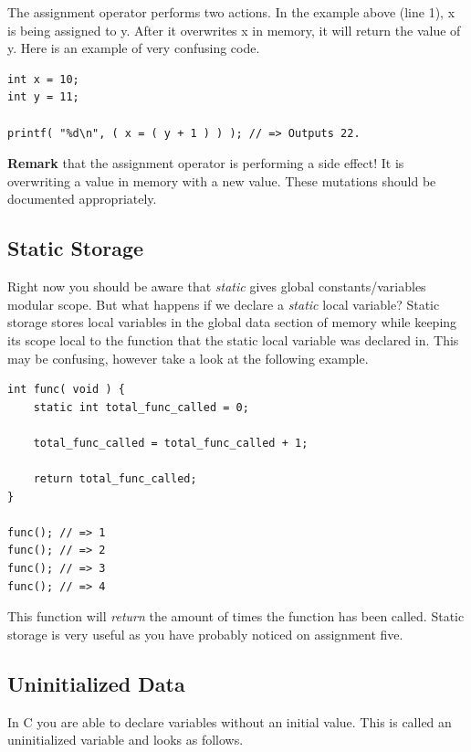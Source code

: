 \documentclass[12pt,extarticle]{article}
\begin{document}
The assignment operator performs two actions. In the example above (line 1), x is being assigned to y. After it overwrites x in memory, it will return the value of y. Here is an example of very confusing code.\\

\lstset {
	language=c
}
\begin{lstlisting}
int x = 10;
int y = 11;

printf( "%d\n", ( x = ( y + 1 ) ) ); // => Outputs 22.
\end{lstlisting}

\textbf{Remark} that the assignment operator is performing a side effect! It is overwriting a value in memory with a new value. These mutations should be documented appropriately.

\subsection{Static Storage}

Right now you should be aware that \emph{static} gives global constants/variables modular scope. But what happens if we declare a \emph{static} local variable? Static storage stores local variables in the global data section of memory while keeping its scope local to the function that the static local variable was declared in. This may be confusing, however take a look at the following example.\\

\lstset {
	language=c
}
\begin{lstlisting}
int func( void ) {
	static int total_func_called = 0;
	
	total_func_called = total_func_called + 1;
	
	return total_func_called;
}

func(); // => 1
func(); // => 2
func(); // => 3
func(); // => 4
\end{lstlisting}

This function will \emph{return} the amount of times the function has been called. Static storage is very useful as you have probably noticed on assignment five.

\subsection{Uninitialized Data}

In C you are able to declare variables without an initial value. This is called an uninitialized variable and looks as follows.\\
\end{document}
